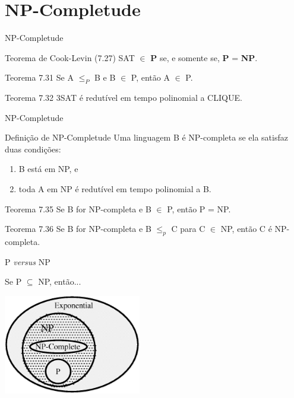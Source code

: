 \documentclass[xcolor=dvipsnames,table]{beamer}
\begin{document}
	\section{NP-Completude}	
	\begin{frame}{NP-Completude}
		\begin{block}{Teorema de Cook-Levin (7.27)}
			SAT $\in$ {\bf P} se, e somente se, {\bf P} = {\bf NP}.
		\end{block} \pause
		\begin{block}{Teorema 7.31}
			Se A $\leq_P$ B e B $\in$ P, então A $\in$ P.
		\end{block} \pause
		\begin{block}{Teorema 7.32}
			3SAT é redutível em tempo polinomial a CLIQUE.
		\end{block}
	\end{frame}
	
	\begin{frame}{NP-Completude}
		\begin{block}{Definição de NP-Completude}
			Uma linguagem B é NP-completa se ela satisfaz duas condições:
			\begin{enumerate}
				\item B está em NP, e
				\item toda A em NP é redutível em tempo polinomial a B.
			\end{enumerate}
		\end{block} \pause
		\begin{block}{Teorema 7.35}
			Se B for NP-completa e B $\in$ P, então P = NP.
		\end{block} \pause
		\begin{block}{Teorema 7.36}
			Se B for NP-completa e B $\leq_p$ C para C $\in$ NP, então C é NP-completa.
		\end{block}
	\end{frame}
	
	\begin{frame}{P {\it versus} NP}
		\begin{block}{Se P $\subseteq$ NP, então...}
			\begin{center}
				\includegraphics[width=6cm]{images/np_completo2.png}
			\end{center}
		\end{block}		
	\end{frame}	
	
	\begin{frame}
		\titlepage
	\end{frame}
	
\end{document}
